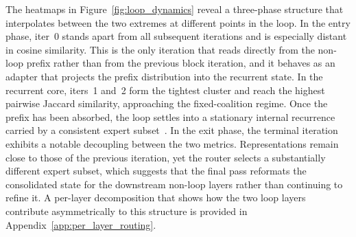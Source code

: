 The heatmaps in Figure~\ref{fig:loop_dynamics} reveal a three-phase structure that interpolates between the two extremes at different points in the loop. In the entry phase, iter~0 stands apart from all subsequent iterations and is especially distant in cosine similarity. This is the only iteration that reads directly from the non-loop prefix rather than from the previous block iteration, and it behaves as an adapter that projects the prefix distribution into the recurrent state. In the recurrent core, iters~1 and~2 form the tightest cluster and reach the highest pairwise Jaccard similarity, approaching the fixed-coalition regime. Once the prefix has been absorbed, the loop settles into a stationary internal recurrence carried by a consistent expert subset~\cite{blayney2026mechanistic}. In the exit phase, the terminal iteration exhibits a notable decoupling between the two metrics. Representations remain close to those of the previous iteration, yet the router selects a substantially different expert subset, which suggests that the final pass reformats the consolidated state for the downstream non-loop layers rather than continuing to refine it. A per-layer decomposition that shows how the two loop layers contribute asymmetrically to this structure is provided in Appendix~\ref{app:per_layer_routing}.

